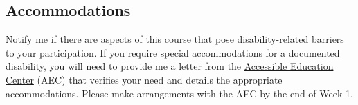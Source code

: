 \documentclass[11pt]{article}
\begin{document}
\subsection*{Accommodations} 

Notify me if there are aspects of this course that pose disability-related barriers to your participation. If you require special accommodations for a documented disability, you will need to provide me a letter from the \href{https://aec.uoregon.edu/}{Accessible Education Center} (AEC) that verifies your need and details the appropriate accommodations. Please make arrangements with the AEC by the end of Week 1. %

\newpage



\newpage
\end{document}
